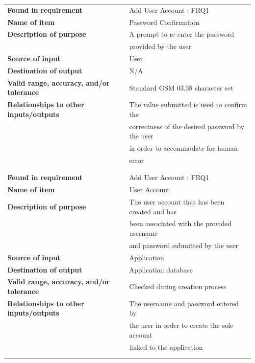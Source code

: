 \begin{tabular}{ll}
\textbf{Found in requirement}&Add User Account : FRQ1\\
\textbf{Name of item}&Password Confirmation\\
\textbf{Description of purpose}&A prompt to re-enter the password\\& provided by the user\\
\textbf{Source of input}&User\\
\textbf{Destination of output}&N/A\\
\textbf{Valid range, accuracy, and/or tolerance}&Standard GSM 03.38 character set\\
\textbf{Relationships to other inputs/outputs}&The value submitted is used to confirm the\\& correctness of the desired password by the user\\& in order to accommodate for human\\& error\\
&\\
&\\
\textbf{Found in requirement}&Add User Account : FRQ1\\
\textbf{Name of item}&User Account\\
\textbf{Description of purpose}&The user account that has been created and has\\& been associated with the provided username\\& and password submitted by the user\\
\textbf{Source of input}&Application\\
\textbf{Destination of output}&Application database\\
\textbf{Valid range, accuracy, and/or tolerance}&Checked during creation process\\
\textbf{Relationships to other inputs/outputs}&The username and password entered by\\& the user in order to create the sole account\\& linked to the application\\
&\\
&\\
\end{tabular}
\newpage

